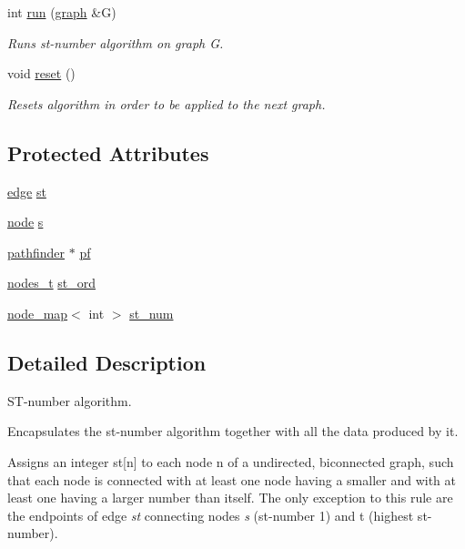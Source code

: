 \begin{DoxyCompactItemize}
int \mbox{\hyperlink{classst__number_af902a0c05d07d47b587e8f7a6b7beaa1}{run}} (\mbox{\hyperlink{classgraph}{graph}} \&G)
\begin{DoxyCompactList}\small\item\em Runs st-\/number algorithm on graph {\ttfamily G}. \end{DoxyCompactList}\item 
void \mbox{\hyperlink{classst__number_ae6f86706b8ae3495d3794b8c684fff0f}{reset}} ()
\begin{DoxyCompactList}\small\item\em Resets algorithm in order to be applied to the next graph. \end{DoxyCompactList}\end{DoxyCompactItemize}
\subsection*{Protected Attributes}
\begin{DoxyCompactItemize}
\item 
\mbox{\hyperlink{classedge}{edge}} \mbox{\hyperlink{classst__number_a58fe3a128f0d06ce17742b62d8eff1a8}{st}}
\item 
\mbox{\hyperlink{classnode}{node}} \mbox{\hyperlink{classst__number_a1ada73c04f88b70b2392aa9ab0d1a6b0}{s}}
\item 
\mbox{\hyperlink{classpathfinder}{pathfinder}} $\ast$ \mbox{\hyperlink{classst__number_a2aa9c83b684379d86c4e620f0a3e5703}{pf}}
\item 
\mbox{\hyperlink{edge_8h_a22ac17689106ba21a84e7bc54d1199d6}{nodes\+\_\+t}} \mbox{\hyperlink{classst__number_af2160b5e111fe3730b4f9f3f3d09f98f}{st\+\_\+ord}}
\item 
\mbox{\hyperlink{classnode__map}{node\+\_\+map}}$<$ int $>$ \mbox{\hyperlink{classst__number_ac3443aa6c9d11b990357d8ac1342cabc}{st\+\_\+num}}
\end{DoxyCompactItemize}


\subsection{Detailed Description}
S\+T-\/number algorithm. 

Encapsulates the st-\/number algorithm together with all the data produced by it. 

Assigns an integer {\ttfamily st\mbox{[}n\mbox{]}} to each node {\ttfamily n} of a undirected, biconnected graph, such that each node is connected with at least one node having a smaller and with at least one having a larger number than itself. The only exception to this rule are the endpoints of edge {\itshape st} connecting nodes {\itshape s} (st-\/number 1) and {\ttfamily t} (highest st-\/number). 

